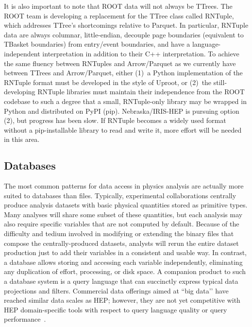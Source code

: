 \documentclass{article}
\begin{document}
It is also important to note that ROOT data will not always be TTrees. The ROOT team is developing a replacement for the TTree class called RNTuple, which addresses TTree's shortcomings relative to Parquet. In particular, RNTuple data are always columnar, little-endian, decouple page boundaries (equivalent to TBasket boundaries) from entry/event boundaries, and have a language-independent interpretation in addition to their C++ interpretation. To achieve the same fluency between RNTuples and Arrow/Parquet as we currently have between TTrees and Arrow/Parquet, either (1)~a Python implementation of the RNTuple format must be developed in the style of Uproot, or (2)~the still-developing RNTuple libraries must maintain their independence from the ROOT codebase to such a degree that a small, RNTuple-only library may be wrapped in Python and distributed on PyPI (pip). Nebraska/IRIS-HEP is pursuing option (2), but progress has been slow. If RNTuple becomes a widely used format without a pip-installable library to read and write it, more effort will be needed in this area.

\subsection{Databases}

The most common patterns for data access in physics analysis are actually more suited to databases than files. Typically, experimental collaborations centrally produce analysis datasets with basic physical quantities stored as primitive types. Many analyses will share some subset of these quantities, but each analysis may also require specific variables that are not computed by default. Because of the difficulty and tedium involved in modifying or extending the binary files that compose the centrally-produced datasets, analysts will rerun the entire dataset production just to add their variables in a consistent and usable way. In contrast, a database allows storing and accessing each variable independently, eliminating any duplication of effort, processing, or disk space. A companion product to such a database system is a query language that can succinctly express typical data projections and filters. Commercial data offerings aimed at ``big data’’ have reached similar data scales as HEP; however, they are not yet competitive with HEP domain-specific tools with respect to query language quality or query performance~\cite{Graur:2021isi}.
\end{document}
